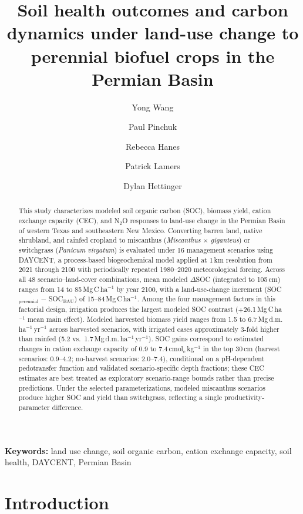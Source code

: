 \documentclass[11pt]{article}
\title{Soil health outcomes and carbon dynamics under land-use change to perennial biofuel crops in the Permian Basin}
\author{Yong Wang \and Paul Pinchuk \and Rebecca Hanes \and Patrick Lamers \and Dylan Hettinger}
\date{}
\begin{document}
\maketitle

\begin{abstract}
This study characterizes modeled soil organic carbon (SOC), biomass yield, cation exchange capacity (CEC), and N$_2$O responses to land-use change in the Permian Basin of western Texas and southeastern New Mexico. Converting barren land, native shrubland, and rainfed cropland to miscanthus (\textit{Miscanthus} $\times$ \textit{giganteus}) or switchgrass (\textit{Panicum virgatum}) is evaluated under 16 management scenarios using DAYCENT, a process-based biogeochemical model applied at 1\,km resolution from 2021 through 2100 with periodically repeated 1980--2020 meteorological forcing. Across all 48 scenario--land-cover combinations, mean modeled $\Delta$SOC (integrated to 105\,cm) ranges from 14 to 85\,Mg\,C\,ha$^{-1}$ by year 2100, with a land-use-change increment (SOC$_\text{perennial}$ $-$ SOC$_\text{BAU}$) of 15--84\,Mg\,C\,ha$^{-1}$. Among the four management factors in this factorial design, irrigation produces the largest modeled SOC contrast (+26.1\,Mg\,C\,ha$^{-1}$ mean main effect). Modeled harvested biomass yield ranges from 1.5 to 6.7\,Mg\,d.m.\,ha$^{-1}$\,yr$^{-1}$ across harvested scenarios, with irrigated cases approximately 3-fold higher than rainfed (5.2 vs.\ 1.7\,Mg\,d.m.\,ha$^{-1}$\,yr$^{-1}$). SOC gains correspond to estimated changes in cation exchange capacity of 0.9 to 7.4\,cmol$_\text{c}$\,kg$^{-1}$ in the top 30\,cm (harvest scenarios: 0.9--4.2; no-harvest scenarios: 2.0--7.4), conditional on a pH-dependent pedotransfer function and validated scenario-specific depth fractions; these CEC estimates are best treated as exploratory scenario-range bounds rather than precise predictions. Under the selected parameterizations, modeled miscanthus scenarios produce higher SOC and yield than switchgrass, reflecting a single productivity-parameter difference.
\end{abstract}

\noindent\textbf{Keywords:} land use change, soil organic carbon, cation exchange capacity, soil health, DAYCENT, Permian Basin

\section*{Introduction}
\end{document}
